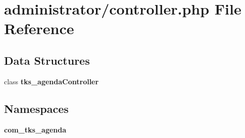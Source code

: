 \section{administrator/controller.php File Reference}
\label{administrator_2controller_8php}
\subsection*{Data Structures}
\begin{DoxyCompactItemize}
\item 
class \textbf{ tks\+\_\+agenda\+Controller}
\end{DoxyCompactItemize}
\subsection*{Namespaces}
\begin{DoxyCompactItemize}
\item 
 \textbf{ com\+\_\+tks\+\_\+agenda}
\end{DoxyCompactItemize}

